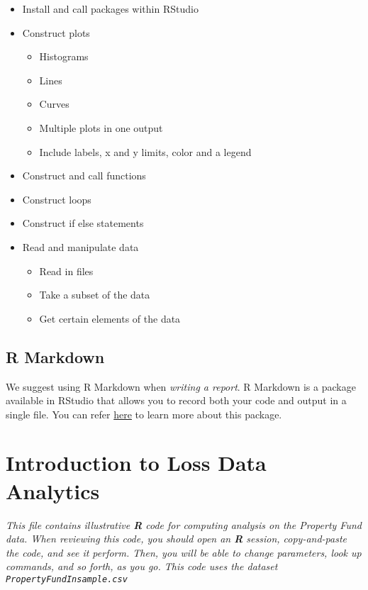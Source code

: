 \documentclass[]{book}
\providecommand{\tightlist}{%
  \setlength{\itemsep}{0pt}\setlength{\parskip}{0pt}}
\theoremstyle{definition}
\theoremstyle{definition}
\theoremstyle{definition}
\theoremstyle{remark}
\begin{document}
\begin{itemize}
\tightlist
\item
  Install and call packages within RStudio
\item
  Construct plots

  \begin{itemize}
  \tightlist
  \item
    Histograms
  \item
    Lines
  \item
    Curves
  \item
    Multiple plots in one output
  \item
    Include labels, x and y limits, color and a legend\\
  \end{itemize}
\item
  Construct and call functions
\item
  Construct loops
\item
  Construct if else statements
\item
  Read and manipulate data

  \begin{itemize}
  \tightlist
  \item
    Read in files
  \item
    Take a subset of the data
  \item
    Get certain elements of the data
  \end{itemize}
\end{itemize}

\section{R Markdown}\label{r-markdown}

We suggest using R Markdown when \emph{writing a report}. R Markdown is
a package available in RStudio that allows you to record both your code
and output in a single file. You can refer
\href{https://rmarkdown.rstudio.com/index.html}{here} to learn more
about this package.

\chapter{Introduction to Loss Data
Analytics}\label{introduction-to-loss-data-analytics}

\emph{This file contains illustrative \textbf{R} code for computing
analysis on the Property Fund data. When reviewing this code, you should
open an \textbf{R} session, copy-and-paste the code, and see it perform.
Then, you will be able to change parameters, look up commands, and so
forth, as you go. This code uses the dataset
\texttt{PropertyFundInsample.csv}}
\end{document}
